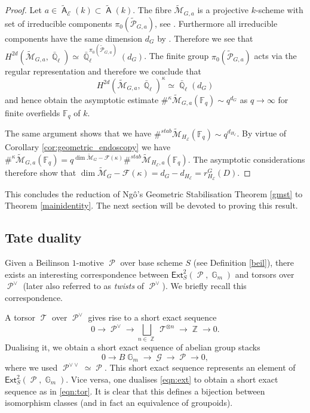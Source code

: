 \documentclass{article}
\DeclareMathOperator{\A}{\mathsf{A}}
\DeclareMathOperator{\Tt}{\mathcal{T}}
\DeclareMathOperator{\Zb}{\mathbb{Z}}
\DeclareMathOperator{\G}{\mathbb{G}}
\newcommand{\Mc}{\mathcal{M}}
\DeclareMathOperator{\Gg}{\mathcal{G}}
\DeclareMathOperator{\Pc}{\mathcal{P}}
\DeclareMathOperator{\Qb}{\mathbb{Q}}
\newcommand{\BF}{{\mathbb{F}}}
\newcommand{\CE}{{\mathcal E}}
\newcommand{\wpc}{\widetilde{\mathcal{P}} }
\newcommand{\wmc}{\widetilde{\Mc} }
\newcommand{\wac}{\widetilde{\A} }
\theoremstyle{definition}
\theoremstyle{plain}
\begin{document}
\begin{proof} Let $a \in \wac_{\CE}(k) \subset \wac(k)$. The fibre $\widetilde{\Mc}_{G,a}$ is a projective $k$-scheme with set of irreducible components $\pi_0(\wpc_{G,a})$, see \cite[4.16.3]{MR2653248}. Furthermore all irreducible components have the same dimension $d_G $ by \cite[4.16.1]{MR2653248}. Therefore we see that $H^{2d}(\widetilde{\Mc}_{G,a},\bar{\Qb}_{\ell}) \simeq \bar{\Qb}_{\ell}^{\pi_0(\wpc_{G,a})}(d_G)$. The finite group $\pi_0(\wpc_{G,a})$ acts via the regular representation and therefore we conclude that 
$$H^{2d}(\widetilde{\Mc}_{G,a},\bar{\Qb}_{\ell})^{\kappa} \simeq \bar{\Qb}_{\ell}(d_G)$$
and hence obtain the asymptotic estimate $\#^{\kappa} \widetilde{\Mc}_{G,a}(\BF_q) \sim q^{d_G}$ as $q \to \infty$ for finite overfields $\BF_q$ of $k$.

The same argument shows that we have $\#^{stab}\widetilde{\Mc}_{H_{\CE}}(\mathbb{F}_q) \sim q^{d_{H_{\CE}}}$. By virtue of Corollary \ref{cor:geometric_endoscopy} we have $\#^{\kappa}\widetilde{\Mc}_{G,a}(\mathbb{F}_q) = q^{\dim \wmc_G - \mathcal{F}(\kappa)} \#^{stab} \widetilde{\Mc}_{H_{\CE},a}(\mathbb{F}_q)$. The asymptotic considerations therefore show that $\dim \wmc_G - \mathcal{F}(\kappa) = d_G - d_{H_{\CE}} = r^G_{H_{\CE}}(D)$.
\end{proof}


This concludes the reduction of Ng\^o's Geometric Stabilisation Theorem \ref{gmst} to Theorem \ref{mainidentity}. The next section will be devoted to proving this result.


\subsection{Tate duality}\label{tate}

Given a Beilinson $1$-motive $\Pc$ over base scheme $S$ (see Definition \ref{beil}), there exists an interesting correspondence between $\mathsf{Ext}^2_S(\Pc,\G_m)$ and torsors over $\Pc^{\vee}$ (later also referred to as \emph{twists} of $\Pc^{\vee}$). We briefly recall this correspondence.

A torsor $\Tt$ over $\Pc^{\vee}$ gives rise to a short exact sequence
\begin{equation}\label{eqn:tor}0 \to \Pc^{\vee} \to \bigsqcup_{n \in \Zb} \Tt^{\otimes n} \to \Zb \to 0.\end{equation}
Dualising it, we obtain a short exact sequence of abelian group stacks
\begin{equation}\label{eqn:ext}0 \to B\G_m \to \Gg \to \Pc \to 0,\end{equation}
where we used $\Pc^{\vee \vee} \simeq \Pc$. This short exact sequence represents an element of $\mathsf{Ext}^2_S(\Pc,\G_m)$. Vice versa, one dualises \eqref{eqn:ext} to obtain a short exact sequence as in \eqref{eqn:tor}. It is clear that this defines a bijection between isomorphism classes (and in fact an equivalence of groupoids).
\end{document}

